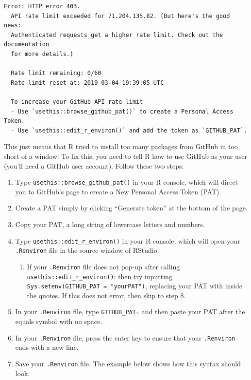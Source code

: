 \documentclass[12pt, krantz2,]{book}
\providecommand{\tightlist}{%
  \setlength{\itemsep}{0pt}\setlength{\parskip}{0pt}}
\theoremstyle{definition}
\theoremstyle{definition}
\theoremstyle{definition}
\newcommand{\1}{\mathbbm{1}}
\begin{document}
\begin{verbatim}
Error: HTTP error 403.
  API rate limit exceeded for 71.204.135.82. (But here's the good news:
  Authenticated requests get a higher rate limit. Check out the documentation
  for more details.)

  Rate limit remaining: 0/60
  Rate limit reset at: 2019-03-04 19:39:05 UTC

  To increase your GitHub API rate limit
  - Use `usethis::browse_github_pat()` to create a Personal Access Token.
  - Use `usethis::edit_r_environ()` and add the token as `GITHUB_PAT`.
\end{verbatim}

This just means that R tried to install too many packages from GitHub in too
short of a window. To fix this, you need to tell R how to use GitHub as your
user (you'll need a GitHub user account). Follow these two steps:

\begin{enumerate}
\def\labelenumi{\arabic{enumi}.}
\item
  Type \texttt{usethis::browse\_github\_pat()} in your R console, which will direct
  you to GitHub's page to create a New Personal Access Token (PAT).
\item
  Create a PAT simply by clicking ``Generate token'' at the bottom of the page.
\item
  Copy your PAT, a long string of lowercase letters and numbers.
\item
  Type \texttt{usethis::edit\_r\_environ()} in your R console, which will open your
  \texttt{.Renviron} file in the source window of RStudio.

  \begin{enumerate}
  \def\labelenumii{\alph{enumii}.}
  \tightlist
  \item
    If your \texttt{.Renviron} file does not pop-up after calling
    \texttt{usethis::edit\_r\_environ()}; then try inputting
    \texttt{Sys.setenv(GITHUB\_PAT\ =\ "yourPAT")}, replacing your PAT with inside the
    quotes. If this does not error, then skip to step 8.
  \end{enumerate}
\item
  In your \texttt{.Renviron} file, type \texttt{GITHUB\_PAT=} and then paste your PAT after
  the equals symbol with no space.
\item
  In your \texttt{.Renviron} file, press the enter key to ensure that your \texttt{.Renviron}
  ends with a new line.
\item
  Save your \texttt{.Renviron} file. The example below shows how this syntax should
  look.
\end{enumerate}
\end{document}
